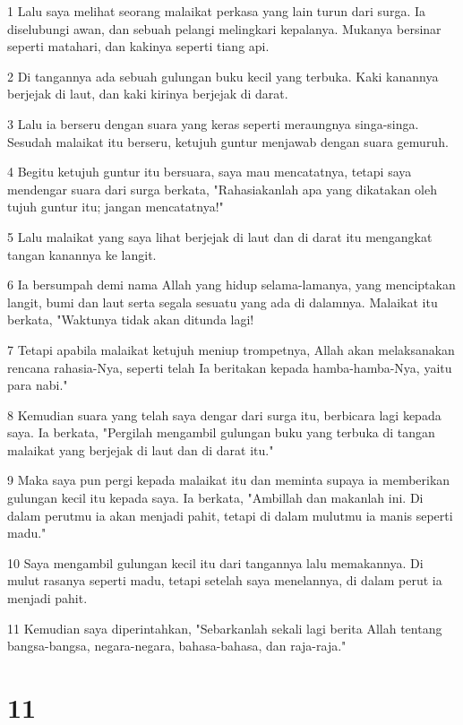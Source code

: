 \par 1 Lalu saya melihat seorang malaikat perkasa yang lain turun dari surga. Ia diselubungi awan, dan sebuah pelangi melingkari kepalanya. Mukanya bersinar seperti matahari, dan kakinya seperti tiang api.
\par 2 Di tangannya ada sebuah gulungan buku kecil yang terbuka. Kaki kanannya berjejak di laut, dan kaki kirinya berjejak di darat.
\par 3 Lalu ia berseru dengan suara yang keras seperti meraungnya singa-singa. Sesudah malaikat itu berseru, ketujuh guntur menjawab dengan suara gemuruh.
\par 4 Begitu ketujuh guntur itu bersuara, saya mau mencatatnya, tetapi saya mendengar suara dari surga berkata, "Rahasiakanlah apa yang dikatakan oleh tujuh guntur itu; jangan mencatatnya!"
\par 5 Lalu malaikat yang saya lihat berjejak di laut dan di darat itu mengangkat tangan kanannya ke langit.
\par 6 Ia bersumpah demi nama Allah yang hidup selama-lamanya, yang menciptakan langit, bumi dan laut serta segala sesuatu yang ada di dalamnya. Malaikat itu berkata, "Waktunya tidak akan ditunda lagi!
\par 7 Tetapi apabila malaikat ketujuh meniup trompetnya, Allah akan melaksanakan rencana rahasia-Nya, seperti telah Ia beritakan kepada hamba-hamba-Nya, yaitu para nabi."
\par 8 Kemudian suara yang telah saya dengar dari surga itu, berbicara lagi kepada saya. Ia berkata, "Pergilah mengambil gulungan buku yang terbuka di tangan malaikat yang berjejak di laut dan di darat itu."
\par 9 Maka saya pun pergi kepada malaikat itu dan meminta supaya ia memberikan gulungan kecil itu kepada saya. Ia berkata, "Ambillah dan makanlah ini. Di dalam perutmu ia akan menjadi pahit, tetapi di dalam mulutmu ia manis seperti madu."
\par 10 Saya mengambil gulungan kecil itu dari tangannya lalu memakannya. Di mulut rasanya seperti madu, tetapi setelah saya menelannya, di dalam perut ia menjadi pahit.
\par 11 Kemudian saya diperintahkan, "Sebarkanlah sekali lagi berita Allah tentang bangsa-bangsa, negara-negara, bahasa-bahasa, dan raja-raja."

\chapter{11}

